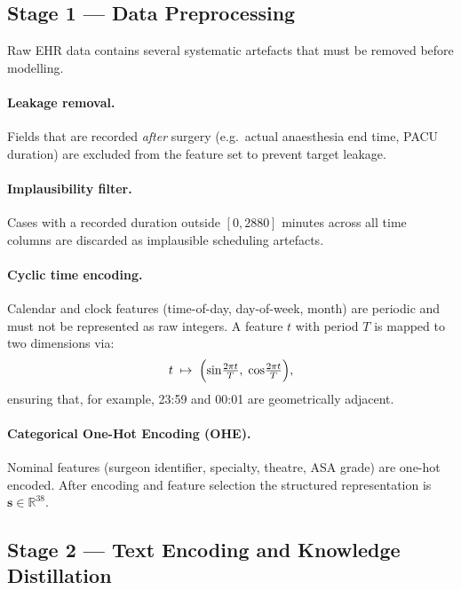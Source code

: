 \subsection{Stage 1 — Data Preprocessing}
\label{sec:stage1}

Raw EHR data contains several systematic artefacts that must be removed before modelling.

\paragraph{Leakage removal.}
Fields that are recorded \emph{after} surgery (e.g.\ actual anaesthesia end time, PACU duration) are excluded from the feature set to prevent target leakage.

\paragraph{Implausibility filter.}
Cases with a recorded duration outside $[0, 2880]$ minutes across all time columns are discarded as implausible scheduling artefacts.

\paragraph{Cyclic time encoding.}
Calendar and clock features (time-of-day, day-of-week, month) are periodic and must not be represented as raw integers. A feature $t$ with period $T$ is mapped to two dimensions via:
\begin{equation}
  t \;\mapsto\; \Bigl(\sin\!\tfrac{2\pi t}{T},\;\cos\!\tfrac{2\pi t}{T}\Bigr),
  \label{eq:cyclic}
\end{equation}
ensuring that, for example, 23:59 and 00:01 are geometrically adjacent.

\paragraph{Categorical One-Hot Encoding (OHE).}
Nominal features (surgeon identifier, specialty, theatre, ASA grade) are one-hot encoded. After encoding and feature selection the structured representation is $\mathbf{s} \in \mathbb{R}^{38}$.

\subsection{Stage 2 — Text Encoding and Knowledge Distillation}
\label{sec:stage2}

